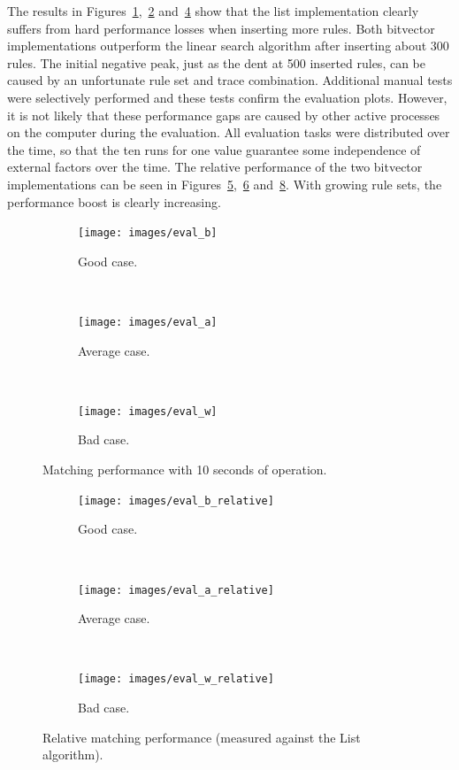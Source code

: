 \documentclass[a4paper,
		12pt,
		parskip=full,
		titlepage
		]{scrartcl}
\begin{document}
The results in Figures~\ref{fig:eval_good_case},~\ref{fig:eval_average_case} and~\ref{fig:eval_bad_case} show that the list implementation
clearly suffers from hard performance losses when inserting more rules.
Both bitvector implementations outperform the linear search algorithm after inserting about 300 rules.
The initial negative peak, just as the dent at 500 inserted rules, can be caused by an unfortunate rule set and trace combination.
Additional manual tests were selectively performed and these tests confirm the evaluation plots.
However, it is not likely that these performance gaps are caused by other active processes on the computer during the evaluation.
All evaluation tasks were distributed over the time, so that the ten runs 
for one value guarantee some independence of external factors over the time.
The relative performance of the two bitvector implementations can be seen in
Figures~\ref{fig:eval_good_case_relative},~\ref{fig:eval_average_case_relative} and~\ref{fig:eval_bad_case_relative}.
With growing rule sets, the performance boost is clearly increasing.

\begin{figure}
    \centering
    \begin{subfigure}{.45\linewidth}
        \centering
        \texttt{[image: images/eval\_b]}
        \caption{Good case.}
        \label{fig:eval_good_case}
    \end{subfigure}
    ~
    \begin{subfigure}{.45\linewidth}
        \centering
        \texttt{[image: images/eval\_a]}
        \caption{Average case.}
        \label{fig:eval_average_case}
    \end{subfigure}
    ~
    \begin{subfigure}{.45\linewidth}
        \centering
        \texttt{[image: images/eval\_w]}
        \caption{Bad case.}
        \label{fig:eval_bad_case}
    \end{subfigure}
    \caption{Matching performance with 10 seconds of operation.}
\end{figure}

\begin{figure}
    \centering
    \begin{subfigure}{.45\linewidth}
        \centering
        \texttt{[image: images/eval\_b\_relative]}
        \caption{Good case.}
        \label{fig:eval_good_case_relative}
    \end{subfigure}
    ~
    \begin{subfigure}{.45\linewidth}
        \centering
        \texttt{[image: images/eval\_a\_relative]}
        \caption{Average case.}
        \label{fig:eval_average_case_relative}
    \end{subfigure}
    ~
    \begin{subfigure}{.45\linewidth}
        \centering
        \texttt{[image: images/eval\_w\_relative]}
        \caption{Bad case.}
        \label{fig:eval_bad_case_relative}
    \end{subfigure}
    \caption{Relative matching performance (measured against the List algorithm).}
\end{figure}
\end{document}
